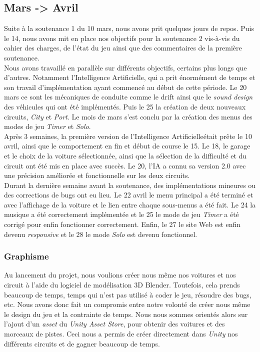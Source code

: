 \documentclass[a4paper,12pt]{article}
\newcommand{\AI}{Intelligence Artificielle}
\begin{document}
        \subsection{Mars -> Avril}
            Suite à la soutenance 1 du 10 mars, nous avons prit quelques jours de repos. Puis le 14, nous
            avons mit en place nos objectifs pour la soutenance 2 vis-à-vis du cahier des charges, de
            l'état du jeu ainsi que des commentaires de la première soutenance.\\
            Nous avons travaillé en parallèle sur différents objectifs, certains plus longs que d'autres.
            Notamment l'\AI, qui a prit énormément de temps et son travail d'implémentation ayant
            commencé au début de cette période. Le 20 mars ce sont les mécaniques de conduite comme le
            drift ainsi que le \textit{sound design} des véhicules qui ont été implémentés. Puis le 25 la
            création de deux nouveaux circuits, \textsl{City} et \textsl{Port}. Le mois de mars s'est
            conclu par la création des menus des modes de jeu \textsl{Timer} et \textsl{Solo}.\\
            Après 3 semaines, la première version de l'\AI était prête le 10 avril, ainsi que le
            comportement en fin et début de course le 15. Le 18, le garage et le choix de la voiture 
            sélectionnée, ainsi que la sélection de la difficulté et du circuit ont été mis en place avec
            succès. Le 20, l'IA a connu sa version 2.0 avec une précision améliorée et fonctionnelle sur
            les deux circuits.\\
            Durant la dernière semaine avant la soutenance, des implémentations mineures ou des
            corrections de bugs ont eu lieu. Le 22 avril le menu principal a été terminé et avec
            l'affichage de la voiture et le lien entre chaque sous-menus a été fait. Le 24 la musique a
            été correctement implémentée et le 25 le mode de jeu \textsl{Timer} a été corrigé pour enfin
            fonctionner correctement. Enfin, le 27 le site Web est enfin devenu \textit{responsive} et le
            28 le mode \textsl{Solo} est devenu fonctionnel.

            \subsubsection{Graphisme}
                Au lancement du projet, nous voulions créer nous même nos voitures et nos circuit à 
                l'aide du logiciel de modélisation 3D Blender. Toutefois, cela prends beaucoup de temps,
                temps qui n'est pas utilisé à coder le jeu, résoudre des bugs, etc. Nous avons donc fait
                un compromis entre notre volonté de créer nous même le design du jeu et la contrainte de
                temps. Nous nous sommes orientés alors sur l'ajout d'un \textit{asset} du \textsl{Unity
                Asset Store}, pour obtenir des voitures et des morceaux de pistes. Ceci nous a permis de
                créer directement dans \textsl{Unity} nos différents circuits et de gagner beaucoup de 
                temps. 
            
\end{document}
